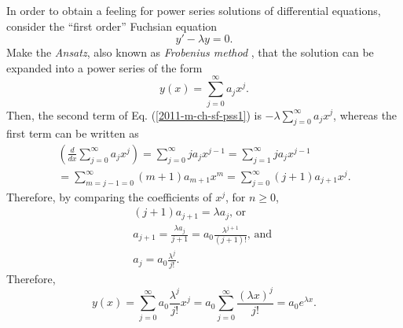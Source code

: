 {
\color{blue}
\bexample
In order to obtain a feeling for power series solutions of differential equations,
consider the ``first order'' Fuchsian equation  \cite{larson-edwards-calculus}
\begin{equation}
y'-\lambda  y=0.
\label{2011-m-ch-sf-pss1}
\end{equation}
Make the {\it Ansatz}, also known as
{\em Frobenius method}
\cite{arfken05},
 that the solution can be expanded into a power series of the form
\begin{equation}
y(x)=\sum_{j=0}^\infty a_j x^j.
\end{equation}
Then,  the second term of Eq. (\ref{2011-m-ch-sf-pss1}) is
$-\lambda   \sum_{j=0}^\infty a_j x^j$, whereas the first term   can be written as
\begin{equation}
\begin{split}
\left(\frac{d}{dx}  \sum_{j=0}^\infty a_j x^j\right) =
 \sum_{j=0}^\infty ja_j x^{j-1}=
 \sum_{j=1}^\infty ja_j x^{j-1}\\
=
 \sum_{m=j-1=0}^\infty (m+1)a_{m+1} x^{m}=
 \sum_{ j =0}^\infty (j+1)a_{j+1} x^{j}.
\end{split}
\label{2011-m-ch-sf-pss2iuzuiz}
\end{equation}
Therefore, by comparing the coefficients of $x^j$,  for $n\ge 0$,
\begin{equation}
\begin{split}
(j+1)a_{j+1}= \lambda   a_j\textrm{, or }\\
a_{j+1}= \frac{\lambda   a_j}{j+1} =a_0 \frac{\lambda ^{j+1}}{(j+1)!}\textrm{, and }\\
a_{j }= a_0 \frac{\lambda ^{j }}{j!}
 .
\end{split}
\end{equation}
Therefore,
\begin{equation}
y(x)=\sum_{j=0}^\infty a_0 \frac{\lambda ^{j }}{j!} x^j=a_0 \sum_{j=0}^\infty \frac{(\lambda  x)^{j }}{j!} =a_0 e^{\lambda  x}.
\end{equation}

\eexample
}


